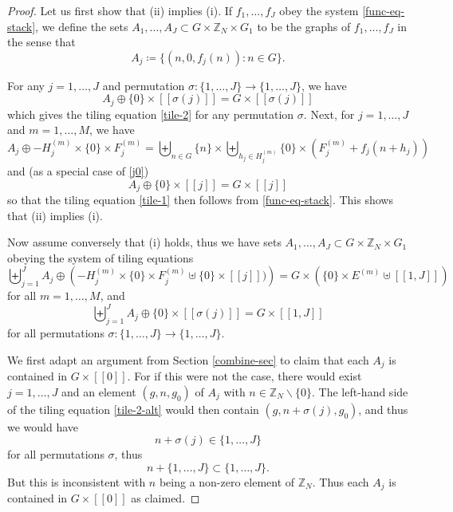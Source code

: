 \documentclass[reqno,a4paper,12pt]{amsart}
\numberwithin{equation}{section}
\numberwithin{figure}{section}
\def\Z{\mathbb{Z}}
\theoremstyle{plain}
\theoremstyle{definition}
\begin{document}
\begin{proof}  Let us first show that (ii) implies (i).  If $f_1,\dots,f_J$ obey the system \eqref{func-eq-stack}, we define the sets $A_1,\dots,A_J \subset G \times \Z_N \times G_1$ to be the graphs of $f_1,\dots,f_J$ in the sense that
\begin{equation}\label{aj-form}
 A_j \coloneqq \{ (n, 0, f_j(n)): n \in G \}.
\end{equation}

For any $j=1,\dots,J$ and permutation $\sigma \colon \{1,\dots,J\} \to \{1,\dots,J\}$, we have
\begin{equation}\label{j0}
A_j \oplus \{0\} \times [[\sigma(j)]] = G \times [[\sigma(j)]]
\end{equation}
which gives the tiling equation \eqref{tile-2} for any permutation $\sigma$.  Next, for $j=1,\dots,J$ and $m=1,\dots,M$, we have
\begin{equation}\label{aj-sum}
A_j \oplus -H_j^{(m)} \times \{0\} \times F_j^{(m)} = \biguplus_{n \in G} \{n\} \times \biguplus_{h_j \in H_j^{(m)}} \{0\} \times (F_j^{(m)} + f_j(n+h_j))
\end{equation}
and (as a special case of \eqref{j0})
$$A_j \oplus \{0\} \times [[j]] = G \times [[j]] 
$$
so that the tiling equation \eqref{tile-1} then follows from \eqref{func-eq-stack}.  This shows that (ii) implies (i).

Now assume conversely that (i) holds, thus we have sets $A_1,\dots,A_J \subset G \times \Z_N \times G_1$ obeying the system of tiling equations 
\begin{equation}\label{tile-1-alt}
\biguplus_{j=1}^J A_j \oplus \left( -H_j^{(m)} \times \{0\} \times F_j^{(m)} \uplus \{0\} \times [[j]])\right) = G \times (\{0\} \times E^{(m)} \uplus [[1,J]])
\end{equation}
for all $m=1,\dots,M$, and
\begin{equation}\label{tile-2-alt}
\biguplus_{j=1}^J A_j \oplus \{0\} \times [[\sigma(j)]]
= G \times [[1,J]] 
\end{equation}
for all permutations $\sigma \colon \{1,\dots,J\} \to \{1,\dots,J\}$.

We first adapt an argument from Section \ref{combine-sec} to claim that each $A_j$ is contained in $G \times [[0]]$.  For if this were not the case, there would exist $j=1,\dots,J$ and an element $(g,n,g_0)$ of $A_j$ with $n \in \Z_N \backslash \{0\}$.  The left-hand side of the tiling equation \eqref{tile-2-alt} would then contain $(g,n+\sigma(j),g_0)$, and thus we would have
$$ n + \sigma(j) \in \{1,\dots,J\}$$
for all permutations $\sigma$, thus
$$ n + \{1,\dots,J\} \subset \{1,\dots,J\}.$$
But this is inconsistent with $n$ being a non-zero element of $\Z_N$.  Thus each $A_j$ is contained in $G \times [[0]]$ as claimed. 


\end{proof}
\end{document}
